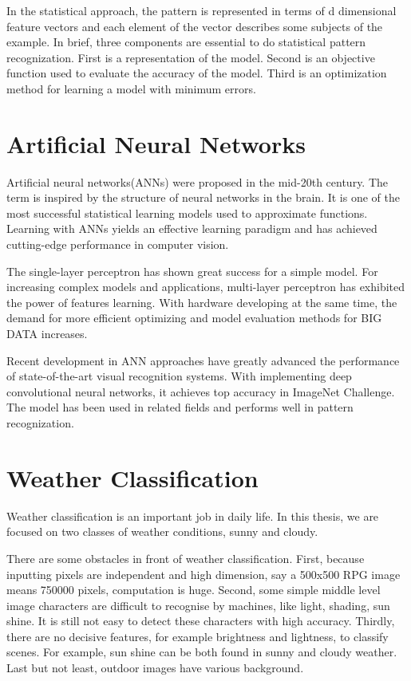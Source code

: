 In the statistical approach, the pattern is represented in terms of d dimensional feature vectors and each element of the vector describes some subjects of the example. In brief, three components are essential to do statistical pattern recognization. First is a representation of the model. Second is an objective function used to evaluate the accuracy of the model. Third is an optimization method for learning a model with minimum errors.

\section{Artificial Neural Networks}

Artificial neural networks(ANNs) were proposed in the mid-20th century. The term is inspired by the structure of neural networks in the brain. It is one of the most successful statistical learning models used to approximate functions. Learning with ANNs yields an effective learning paradigm and has achieved cutting-edge performance in computer vision. 

The single-layer perceptron  has shown great success for a simple model. For increasing complex models and applications, multi-layer perceptron has exhibited the power of features learning. With hardware developing at the same time, the demand for more efficient optimizing and model evaluation methods for BIG DATA increases. 

Recent development in ANN approaches have greatly advanced the performance of state-of-the-art visual recognition systems. With implementing deep convolutional neural networks, it achieves top accuracy in ImageNet Challenge. The model has been used in related fields and performs well in pattern recognization.

\section{Weather Classification}

Weather classification is an important job in daily life. In this thesis, we are focused on two classes of weather conditions, sunny and cloudy. 

There are some obstacles in front of weather classification. First, because inputting pixels are independent and high dimension, say a 500x500 RPG image means 750000 pixels, computation is huge. Second, some simple middle level image characters are difficult to recognise by machines, like light, shading, sun shine. It is still not easy to detect these characters with high accuracy.  Thirdly, there are no decisive features, for example brightness and lightness, to classify scenes. For example, sun shine can be both found in sunny and cloudy weather. Last but not least, outdoor images have various background.


